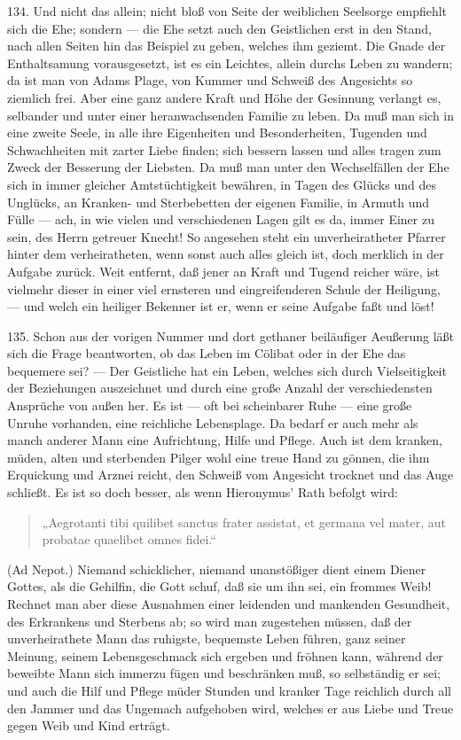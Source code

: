 134. Und nicht das allein; nicht bloß von Seite der weiblichen Seelsorge empfiehlt sich die Ehe; sondern
— die Ehe setzt auch den Geistlichen erst in den Stand, nach allen Seiten hin das Beispiel zu geben, welches ihm geziemt. Die Gnade der Enthaltsamung vorausgesetzt, ist es ein Leichtes, allein durchs Leben zu wandern; da ist man von Adams Plage, von Kummer und Schweiß des Angesichts so ziemlich frei. Aber eine ganz andere Kraft und Höhe der Gesinnung verlangt es, selbander und unter einer heranwachsenden Familie zu leben. Da muß man sich in eine zweite Seele, in alle ihre Eigenheiten und Besonderheiten, Tugenden und Schwachheiten mit zarter Liebe finden; sich bessern lassen und alles tragen zum Zweck der Besserung der Liebsten. Da muß man unter den Wechselfällen der Ehe sich in immer gleicher Amtstüchtigkeit bewähren, in Tagen des Glücks und des Unglücks, an Kranken- und Sterbebetten der eigenen Familie, in Armuth und Fülle — ach, in wie vielen und verschiedenen Lagen gilt es da, immer Einer zu sein, des Herrn getreuer Knecht! So angesehen steht ein unverheiratheter Pfarrer hinter dem verheiratheten, wenn sonst auch alles gleich ist, doch merklich in der Aufgabe zurück. Weit entfernt, daß jener an Kraft und Tugend reicher wäre, ist vielmehr dieser in einer viel ernsteren und eingreifenderen Schule der Heiligung, — und welch ein heiliger Bekenner ist er, wenn er seine Aufgabe faßt und löst!

135. Schon aus der vorigen Nummer und dort gethaner beiläufiger Aeußerung läßt sich die Frage beantworten, ob das Leben im Cölibat oder in der Ehe das bequemere sei? — Der Geistliche hat ein Leben, welches sich durch Vielseitigkeit der Beziehungen auszeichnet und
durch eine große Anzahl der verschiedensten Ansprüche von außen her. Es ist — oft bei scheinbarer Ruhe — eine große Unruhe vorhanden, eine reichliche Lebensplage. Da bedarf er auch mehr als manch anderer Mann eine Aufrichtung, Hilfe und Pflege. Auch ist dem kranken, müden, alten und sterbenden Pilger wohl eine treue Hand zu gönnen, die ihm Erquickung und Arznei reicht, den Schweiß vom Angesicht trocknet und das Auge schließt. Es ist so doch besser, als wenn Hieronymus’ Rath befolgt wird:

\begin{quote}
„Aegrotanti tibi quilibet sanctus frater assistat, et germana vel mater, aut probatae quaelibet omnes fidei.“
\end{quote}

(Ad Nepot.) Niemand schicklicher, niemand unanstößiger dient einem Diener Gottes, als die Gehilfin, die Gott schuf, daß sie um ihn sei, ein frommes Weib! Rechnet man aber diese Ausnahmen einer leidenden und mankenden Gesundheit, des Erkrankens und Sterbens ab; so wird man zugestehen müssen, daß der unverheirathete Mann das ruhigste, bequemste Leben führen, ganz seiner Meinung, seinem Lebensgeschmack sich ergeben und fröhnen kann, während der beweibte Mann sich immerzu fügen und beschränken muß, so selbständig er sei; und auch die Hilf und Pflege müder Stunden und kranker Tage reichlich durch all den Jammer und das Ungemach aufgehoben wird, welches er aus Liebe und Treue gegen Weib und Kind erträgt.

